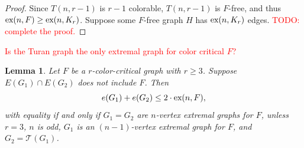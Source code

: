 \documentclass[a4paper]{article}
\newtheorem{lemma}[theorem]{Lemma}
\begin{document}
\begin{proof}
  Since $T(n, r - 1)$ is $r - 1$ colorable, $T(n, r - 1)$ is $F$-free, and thus $\textnormal{ex}(n,
  F) \geq \textnormal{ex}(n, K_{r})$. Suppose some $F$-free graph $H$ has $\textnormal{ex}(n, K_r)$
  edges. \textcolor{red}{TODO: complete the proof.}
\end{proof}

\textcolor{red}{Is the Turan graph the only extremal graph for color critical $F$?}

\begin{lemma}
  Let $F$ be a $r$-color-critical graph with $r \geq 3$. Suppose $E(G_1) \cap E(G_2)$ does not
  include $F$. Then
  \[
    e(G_1) + e(G_2) \leq 2 \cdot \textnormal{ex}(n, F),
  \]
  with equality if and only if $G_1 = G_2$ are $n$-vertex extremal graphs for $F$, unless $r = 3$,
  $n$ is odd, $G_1$ is an $(n - 1)$-vertex extremal graph for $F$, and $G_2 = \mathcal{T}(G_1)$. 
\end{lemma}
\end{document}
